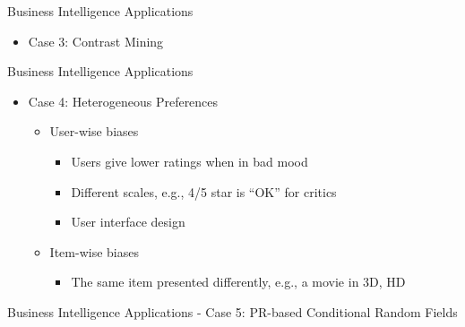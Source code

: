 \documentclass[
 size=14pt,
 paper=smartboard,  %
 mode=present, 		%
 display=slides, 	%
 style=tuliplab,  	%
 pauseslide,
 fleqn,leqno]{powerdot}
\begin{document}
\begin{slide}[toc=,bm=]{Business Intelligence Applications}
\begin{itemize}
\item
Case 3: Contrast Mining
\end{itemize}

\end{slide}


\begin{slide}[toc=,bm=]{Business Intelligence Applications}
\begin{itemize}
\item
Case 4: Heterogeneous Preferences
\begin{itemize}
\item
User-wise biases

\begin{itemize}
\item
Users give lower ratings when in bad mood

\item
Different scales, e.g., 4/5 star is ``OK'' for critics

\item
User interface design

\end{itemize}

\item
Item-wise biases

\begin{itemize}
\item
The same item presented differently,
e.g., a movie in 3D, HD

\end{itemize}
\end{itemize}
\end{itemize}
\end{slide}


\begin{slide}[toc=,bm=]{Business Intelligence Applications
 - Case 5: PR-based Conditional Random Fields}


\end{slide}
\end{document}
